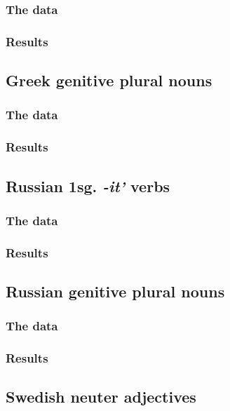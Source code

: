 \subsubsection{The data}

\subsubsection{Results}

\subsection{Greek genitive plural nouns}

\subsubsection{The data}

\subsubsection{Results}

\subsection{Russian 1sg. \emph{-it'} verbs}

\subsubsection{The data}

\subsubsection{Results}

\subsection{Russian genitive plural nouns}

\subsubsection{The data}

\subsubsection{Results}

\subsection{Swedish neuter adjectives}

